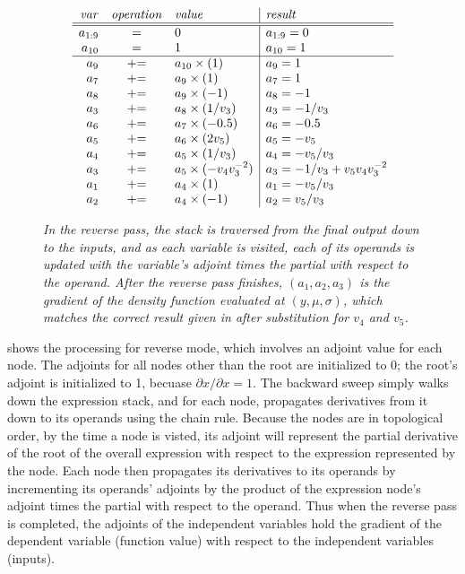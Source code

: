 \documentclass[10pt]{article}
\begin{document}
\begin{figure}
\[
\begin{array}{rcl|l}
{\it var} & {\it operation} & {\it value} & {\it result}
\\ \hline \hline
a_{1:9} & = & 0 & a_{1:9} = 0
\\
a_{10} & = & 1 & a_{10} = 1
\\ \hline
a_{9} & {+}{=} & a_{10} \times (1) & a_9 = 1
\\
a_{7} & {+}{=} & a_9 \times (1) & a_7 = 1
\\
a_{8} & {+}{=} & a_9 \times (-1) & a_8 = -1
\\
a_{3} & {+}{=} & a_8 \times (1 / v_3) & a_3 = -1 / v_3
\\
a_{6} & {+}{=} & a_7 \times (-0.5) & a_6 = -0.5
\\
a_{5} & {+}{=} & a_6 \times (2 v_5) & a_5 = -v_5
\\
a_{4} & {+}{=} & a_5 \times (1 / v_3) & a_4 = -v_5 / v_3
\\
a_{3} & {+}{=} & a_5 \times (-v_4 v_3^{-2}) & a_3 = -1 / v_3 + v_5 v_4 v_3^{-2}
\\
a_{1} & {+}{=} & a_4 \times (1) & a_1 = -v_5 / v_3
\\
a_{2} & {+}{=} & a_4 \times (-1) & a_2 = v_5 / v_3
\end{array}
\]
\vspace*{-12pt}
\caption{\small\it In the reverse pass, the stack is
  traversed from the final output down to the inputs, and as each
  variable is visited, each of its operands is updated with the
  variable's adjoint times the partial with respect to the operand.
  After the reverse pass finishes, $(a_1,a_2,a_3)$ is the gradient of
  the density function evaluated at $(y,\mu,\sigma)$, which matches
  the correct result given in 
  after substitution for $v_4$ and $v_5$.}
  \label{autodiff-stack.figure}
\end{figure}
%
 shows the processing for reverse mode,
which involves an adjoint value for each node.  The adjoints for all
nodes other than the root are initialized to 0; the root's adjoint is
initialized to 1, becuase $\partial x / \partial x = 1$.  The backward
sweep simply walks down the expression stack, and for each node,
propagates derivatives from it down to its operands using the chain
rule.  Because the nodes are in topological order, by the time a node
is visted, its adjoint will represent the partial derivative of the
root of the overall expression with respect to the expression
represented by the node.  Each node then propagates its derivatives to
its operands by incrementing its operands' adjoints by the product of
the expression node's adjoint times the partial with respect to the
operand.  Thus when the reverse pass is completed, the adjoints of the
independent variables hold the gradient of the dependent variable
(function value) with respect to the independent variables (inputs).
\end{document}
